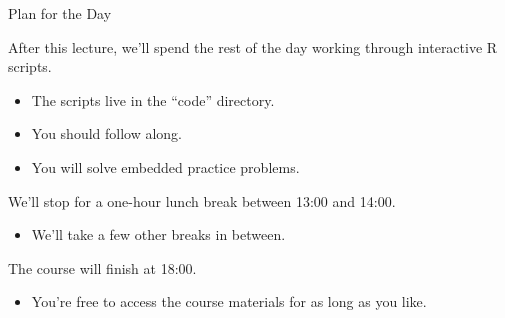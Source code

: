 \documentclass[10pt]{beamer}
\begin{document}
\begin{frame}{Plan for the Day}

  After this lecture, we'll spend the rest of the day working through
  interactive R scripts.
  \begin{itemize}
  \item The scripts live in the ``code'' directory.
  \item You should follow along.
  \item You will solve embedded practice problems.
  \end{itemize}
  \vb
  We'll stop for a one-hour lunch break between 13:00 and 14:00.
  \begin{itemize}
  \item We'll take a few other breaks in between.
  \end{itemize}
  \vb
  The course will finish at 18:00.
  \begin{itemize}
  \item You're free to access the course materials for as long as you like.
  \end{itemize}
  
\end{frame}
\end{document}
